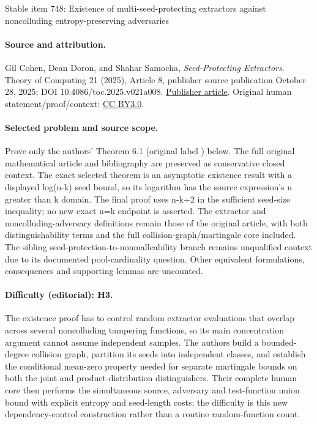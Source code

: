 \documentclass[11pt]{article}
\numberwithin{equation}{section}
\theoremstyle{definition}
\theoremstyle{plain}
\begin{document}
\begin{center}{\Large Stable item 748: Existence of multi-seed-protecting extractors against noncolluding entropy-preserving adversaries}\end{center}
\paragraph{Source and attribution.}
Gil Cohen, Dean Doron, and Shahar Samocha, \emph{Seed-Protecting Extractors}. Theory of Computing 21 (2025), Article 8, publisher source publication October 28, 2025; DOI 10.4086/toc.2025.v021a008. \href{https://theoryofcomputing.org/articles/v021a008/}{Publisher article}. Original human statement/proof/context: \href{https://creativecommons.org/licenses/by/3.0/}{CC BY3.0}.
\paragraph{Selected problem and source scope.}
Prove only the authors' Theorem 6.1 (original label ) below. The full original mathematical article and bibliography are preserved as conservative closed context. The exact selected theorem is an asymptotic existence result with a displayed log(n-k) seed bound, so its logarithm has the source expression's n greater than k domain. The final proof uses n-k+2 in the sufficient seed-size inequality; no new exact n=k endpoint is asserted. The extractor and noncolluding-adversary definitions remain those of the original article, with both distinguishability terms and the full collision-graph/martingale core included. The sibling seed-protection-to-nonmalleability branch remains unqualified context due to its documented pool-cardinality question.  Other equivalent formulations, consequences and supporting lemmas are uncounted.
\paragraph{Difficulty (editorial): H3.}
The existence proof has to control random extractor evaluations that overlap across several noncolluding tampering functions, so its main concentration argument cannot assume independent samples. The authors build a bounded-degree collision graph, partition its seeds into independent classes, and establish the conditional mean-zero property needed for separate martingale bounds on both the joint and product-distribution distinguishers. Their complete human core then performs the simultaneous source, adversary and test-function union bound with explicit entropy and seed-length costs; the difficulty is this new dependency-control construction rather than a routine random-function count.
\end{document}
